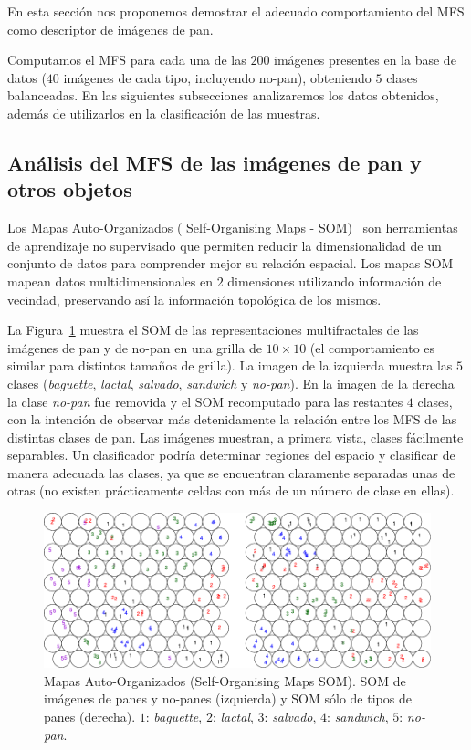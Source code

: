 En esta sección nos proponemos demostrar el adecuado comportamiento del MFS como descriptor de imágenes de pan.

Computamos el MFS para cada una de las $200$ imágenes presentes en la base de datos ($40$ imágenes de cada tipo, incluyendo no-pan), obteniendo $5$ clases balanceadas.
En las siguientes subsecciones analizaremos los datos obtenidos, además de utilizarlos en la clasificación de las muestras.

\subsection{Análisis del MFS de las imágenes de pan y otros objetos}

Los Mapas Auto-Organizados ( Self-Organising Maps -  \acrshort{SOM})~\cite{Kohonen2001} son herramientas de aprendizaje no supervisado que permiten reducir la dimensionalidad de un conjunto de datos para comprender mejor su relación espacial.
Los mapas SOM mapean datos multidimensionales en $2$ dimensiones utilizando información de vecindad, preservando así la información topológica de los mismos.

La Figura~\ref{fig:somfractal} muestra el  SOM de las representaciones multifractales de las imágenes de pan y de no-pan en una grilla de $10\times 10$ (el comportamiento es similar para distintos tamaños de grilla).
La imagen de la izquierda muestra las $5$ clases ({\em baguette}, {\em lactal}, {\em salvado}, {\em sandwich} y {\em no-pan}).
En la imagen de la derecha la clase {\em no-pan} fue removida y el SOM recomputado para las restantes $4$ clases, con la intención de observar más detenidamente la relación entre los MFS de las distintas clases de pan.
Las imágenes muestran, a primera vista, clases fácilmente separables.
Un clasificador podría determinar regiones del espacio y clasificar de manera adecuada las clases, ya que se encuentran claramente separadas unas de otras (no existen prácticamente celdas con más de un número de clase en ellas).

\begin{figure}[h!]
\begin{centering}
\includegraphics[width=13cm]{SOM}
\caption[Mapas Auto-Organizados de imágenes de panes y otros objetos]{Mapas Auto-Organizados (Self-Organising Maps SOM). SOM de imágenes de panes y no-panes (izquierda) y SOM sólo de tipos de panes (derecha). $1$: {\em baguette}, $2$: {\em lactal}, $3$: {\em salvado}, $4$: {\em sandwich}, $5$: {\em no-pan}.}
\label{fig:somfractal}
\end{centering}
\end{figure}

